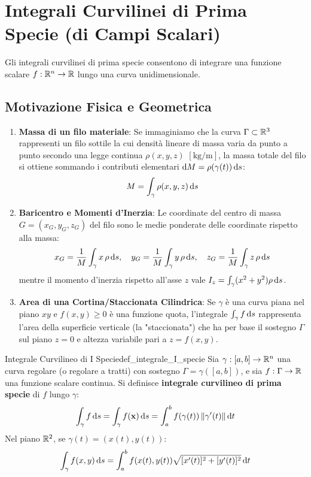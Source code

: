 \section{Integrali Curvilinei di Prima Specie (di Campi Scalari)}

Gli integrali curvilinei di prima specie consentono di integrare una funzione scalare $f: \mathbb{R}^n \to \mathbb{R}$ lungo una curva unidimensionale. 

\subsection{Motivazione Fisica e Geometrica}
\begin{enumerate}
    \item \textbf{Massa di un filo materiale}: Se immaginiamo che la curva $\Gamma \subset \mathbb{R}^3$ rappresenti un filo sottile la cui densità lineare di massa varia da punto a punto secondo una legge continua $\rho(x,y,z)$ $[\text{kg/m}]$, la massa totale del filo si ottiene sommando i contributi elementari $\mathop{}\!\mathrm{d} M = \rho(\gamma(t))\mathop{}\!\mathrm{d} s$:
    \[
    M = \int_\gamma \rho(x,y,z) \mathop{}\!\mathrm{d} s
    \]
    \item \textbf{Baricentro e Momenti d'Inerzia}: Le coordinate del centro di massa $G = (x_G, y_G, z_G)$ del filo sono le medie ponderate delle coordinate rispetto alla massa:
    \[
    x_G = \frac{1}{M} \int_\gamma x \, \rho \mathop{}\!\mathrm{d} s, \quad y_G = \frac{1}{M} \int_\gamma y \, \rho \mathop{}\!\mathrm{d} s, \quad z_G = \frac{1}{M} \int_\gamma z \, \rho \mathop{}\!\mathrm{d} s
    \]
    mentre il momento d'inerzia rispetto all'asse $z$ vale $I_z = \int_\gamma (x^2 + y^2) \rho \mathop{}\!\mathrm{d} s$.
    \item \textbf{Area di una Cortina/Staccionata Cilindrica}: Se $\gamma$ è una curva piana nel piano $xy$ e $f(x,y) \ge 0$ è una funzione quota, l'integrale $\int_\gamma f \mathop{}\!\mathrm{d} s$ rappresenta l'area della superficie verticale (la "staccionata") che ha per base il sostegno $\Gamma$ sul piano $z=0$ e altezza variabile pari a $z = f(x,y)$.
\end{enumerate}

\begin{definizione}{Integrale Curvilineo di I Specie}{def_integrale_I_specie}
Sia $\gamma: [a,b] \to \mathbb{R}^n$ una curva regolare (o regolare a tratti) con sostegno $\Gamma = \gamma([a,b])$, e sia $f: \Gamma \to \mathbb{R}$ una funzione scalare continua. Si definisce \textbf{integrale curvilineo di prima specie} di $f$ lungo $\gamma$:
\[
\int_\gamma f \mathop{}\!\mathrm{d} s = \int_{\gamma} f(\mathbf{x}) \mathop{}\!\mathrm{d} s = \int_{a}^{b} f(\gamma(t)) \, \lVert\gamma'(t)\rVert \mathop{}\!\mathrm{d} t
\]
Nel piano $\mathbb{R}^2$, se $\gamma(t) = (x(t), y(t))$:
\[
\int_\gamma f(x,y) \mathop{}\!\mathrm{d} s = \int_{a}^{b} f(x(t), y(t)) \sqrt{[x'(t)]^2 + [y'(t)]^2} \mathop{}\!\mathrm{d} t
\]
\end{definizione}

